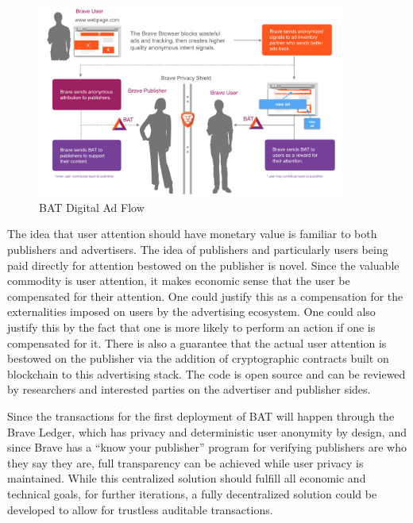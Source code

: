 \documentclass[11pt]{article}
\begin{document}
\begin{figure}
\begin{center}
\includegraphics[width=0.9\textwidth]{BAT_digital_ad_flow.png}
\caption{BAT Digital Ad Flow}
\end{center}
\end{figure}



The idea that user attention should have monetary value is familiar to
both publishers and advertisers. The idea of publishers and
particularly users being paid directly for attention bestowed on the
publisher is novel. Since the valuable commodity is user attention, it
makes economic sense that the user be compensated for their
attention. One could justify this as a compensation for the
externalities imposed on users by the advertising ecosystem. One could
also justify this by the fact that one is more likely to perform an
action if one is compensated for it. There is also a guarantee that
the actual user attention is bestowed on the publisher via the
addition of cryptographic contracts built on blockchain to this
advertising stack.  The code is open source and can be reviewed by
researchers and interested parties on the advertiser and publisher sides.

Since the transactions for the first deployment of BAT will happen
through the Brave Ledger, which has privacy and deterministic user
anonymity by design, and since Brave has a “know your publisher”
program for verifying publishers are who they say they are, full
transparency can be achieved while user privacy is maintained. While this 
centralized solution should fulfill all economic and technical goals, for further iterations, a fully
decentralized solution could be developed to allow for trustless
auditable transactions.
\end{document}
